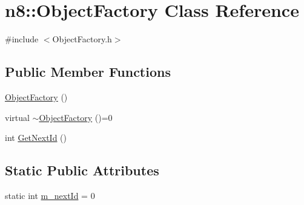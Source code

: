 \hypertarget{classn8_1_1_object_factory}{\section{n8\-:\-:Object\-Factory Class Reference}
\label{classn8_1_1_object_factory}
}


{\ttfamily \#include $<$Object\-Factory.\-h$>$}

\subsection*{Public Member Functions}
\begin{DoxyCompactItemize}
\item 
\hyperlink{classn8_1_1_object_factory_a0da24c26e7ece19314ede4d785bbace0}{Object\-Factory} ()
\item 
virtual \hyperlink{classn8_1_1_object_factory_adfdbda35f6b0f3a3cc1bc224f4712c03}{$\sim$\-Object\-Factory} ()=0
\item 
int \hyperlink{classn8_1_1_object_factory_a1f79e646d459d001f62f1920c323e204}{Get\-Next\-Id} ()
\end{DoxyCompactItemize}
\subsection*{Static Public Attributes}
\begin{DoxyCompactItemize}
\item 
static int \hyperlink{classn8_1_1_object_factory_af9e6c6cb3ab18962dfa4859ceb289923}{m\-\_\-next\-Id} = 0
\end{DoxyCompactItemize}


